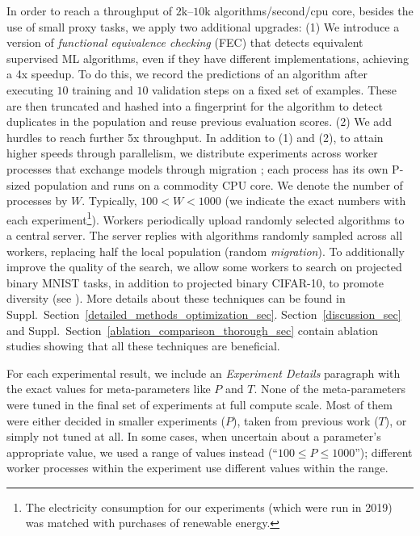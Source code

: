 In order to reach a throughput of $2\textrm{k}$--$10\textrm{k}$ algorithms/second/cpu core, besides the use of small proxy tasks, we apply two additional upgrades: (1) We introduce a version of \textit{functional equivalence checking} (FEC) that detects equivalent supervised ML algorithms, even if they have different implementations, achieving a 4x speedup. To do this, we record the predictions of an algorithm after executing $10$ training and $10$ validation steps on a fixed set of examples. These are then truncated and hashed into a fingerprint for the algorithm to detect duplicates in the population and reuse previous evaluation scores. (2) We add hurdles \cite{So2019TheET} to reach further 5x throughput. In addition to (1) and (2), to attain higher speeds through parallelism, we distribute experiments across worker processes that exchange models through migration \cite{alba2002parallelism}; each process has its own P-sized population and runs on a commodity CPU core. We denote the number of processes by $W$. Typically, $100\!\!<\!\!W\!\!<\!\!1000$ (we indicate the exact numbers with each experiment\footnote{The electricity consumption for our experiments (which were run in 2019) was matched with purchases of renewable energy.}). Workers periodically upload randomly selected algorithms to a central server. The server replies with algorithms randomly sampled across all workers, replacing half the local population (\ie random \emph{migration}). To additionally improve the quality of the search, we allow some workers to search on projected binary MNIST tasks, in addition to projected binary CIFAR-10, to promote diversity (see \eg \cite{wang2019paired}). More details about these techniques can be found in Suppl.\ Section~\ref{detailed_methods_optimization_sec}. Section~\ref{discussion_sec} and Suppl.\ Section~\ref{ablation_comparison_thorough_sec} contain ablation studies showing that all these techniques are beneficial.

For each experimental result, we include an \textit{Experiment Details} paragraph with the exact values for meta-parameters like $P$ and $T$. None of the meta-parameters were tuned in the final set of experiments at full compute scale. Most of them were either decided in smaller experiments (\eg $P$), taken from previous work (\eg $T$), or simply not tuned at all. In some cases, when uncertain about a parameter's appropriate value, we used a range of values instead (\eg ``$100 \leq P \leq 1000$''); different worker processes within the experiment use different values within the range.

